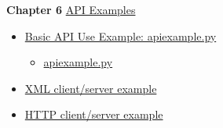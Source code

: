 {\bf Chapter 6} \hyperlink{ardguide_sec_6}{API Examples}\begin{itemize}
\item \hyperlink{ardguide_sec_6_1}{Basic API Use Example: apiexample.py}\begin{itemize}
\item \hyperlink{ardguide_sec_6_1_ardguide_sec_6_1_1}{apiexample.py}\end{itemize}
\item \hyperlink{ardguide_sec_6_2}{XML client/server example}\item \hyperlink{ardguide_sec_6_3}{HTTP client/server example} \end{itemize}
